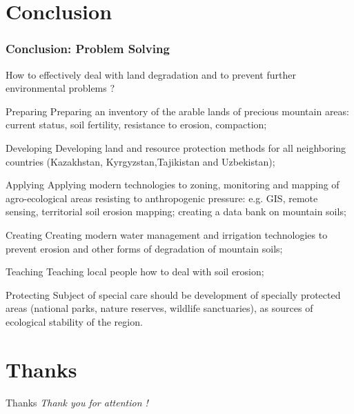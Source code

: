 \documentclass[pdflatex,compress,8pt,
	xcolor={dvipsnames,dvipsnames,svgnames,x11names,table},
	hyperref={colorlinks = true,
	breaklinks = true, 
	urlcolor = NavyBlue, 
	breaklinks = true}]{beamer}
\begin{document}
\section{Conclusion}
\begin{frame}\frametitle{Conclusion: Problem Solving}

How to effectively deal with land degradation and to prevent further environmental problems ?

\begin{alertblock}{Preparing}
Preparing an inventory of the arable lands of precious mountain areas: current status, soil fertility, resistance to erosion, compaction;
\end{alertblock}

\begin{block}{Developing}
Developing land and resource protection methods for all neighboring countries (Kazakhstan, Kyrgyzstan,Tajikistan and Uzbekistan);
\end{block}

\begin{alertblock}{Applying}
Applying modern technologies to zoning, monitoring and mapping of agro-ecological areas resisting to anthropogenic pressure: e.g. GIS, remote sensing, territorial soil erosion mapping; creating a data bank on mountain soils;
\end{alertblock}

\begin{block}{Creating}
Creating modern water management and irrigation technologies to prevent erosion and other forms of degradation of mountain soils;
\end{block}

\begin{alertblock}{Teaching}
Teaching local people how to deal with soil erosion;
\end{alertblock}

\begin{block}{Protecting}
Subject of special care should be development of specially protected areas (national parks, nature reserves, wildlife sanctuaries), as sources of ecological stability of the region.
\end{block}

\end{frame}

\section{Thanks}
\begin{frame}{Thanks}
  	\centering \LARGE 
  	\emph{Thank you for attention !}\\
\end{frame}
\end{document}
